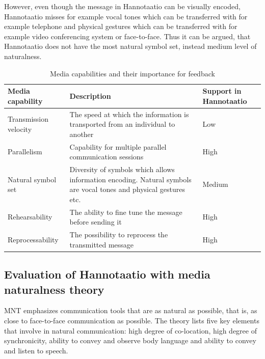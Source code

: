 \documentclass[english,12pt,a4paper,pdftex]{article}
\begin{document}
However, even though the message in Hannotaatio can be visually encoded, Hannotaatio misses for example vocal tones which can be transferred with for example telephone and physical gestures which can be transferred with for example video conferencing system or face-to-face. Thus it can be argued, that Hannotaatio does not have the most natural symbol set, instead medium level of naturalness.

\begin{table}[!h]
\renewcommand{\arraystretch}{1.3}
\caption{Media capabilities and their importance for feedback}
\label{table:capabilities}
\centering
\begin{tabular}{|p{4cm}|p{7cm}|p{3cm}|}
\hline
\textbf{Media \newline capability} & \textbf{Description} & \textbf{Support in Hannotaatio}\\
\hline
Transmission \newline velocity & The speed at which the information is transported from an individual to another & Low\\
\hline
Parallelism & Capability for multiple parallel communication sessions & High\\
\hline
Natural symbol set & Diversity of symbols which allows information encoding. Natural symbols are vocal tones and physical gestures etc. & Medium\\
\hline
Rehearsability & The ability to fine tune the message before sending it & High\\
\hline
Reprocessability & The possibility to reprocess the transmitted message & High\\
\hline
\end{tabular}
\end{table}

\subsection{Evaluation of Hannotaatio with media naturalness theory}

\Ac{MNT} emphasizes communication tools that are as natural as possible, that is, as close to face-to-face communication as possible. The theory lists five key elements that involve in natural communication: high degree of co-location, high degree of synchronicity, ability to convey and observe body language and ability to convey and listen to speech.
\end{document}

